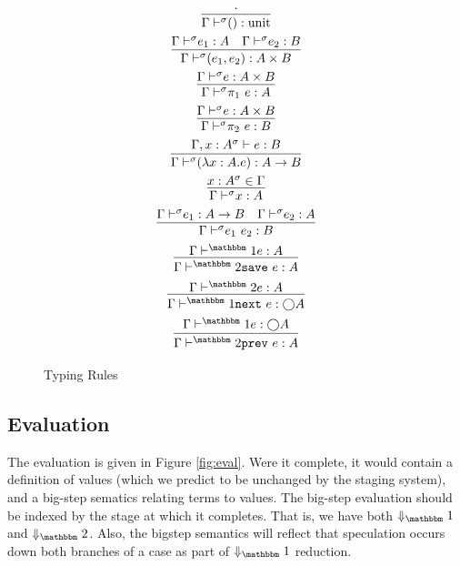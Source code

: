 \documentclass[11pt]{article}
\newcommand {\fut} {\bigcirc}
\newcommand {\bbone} {\mathbbm 1}
\newcommand {\bbtwo} {\mathbbm 2}
\newcommand {\pause} {{\tt save}}
\newcommand {\next} {{\tt next}}
\newcommand {\prev} {{\tt prev}}
\newcommand {\gds} {{\Gamma \vdash^\sigma}}
\newcommand {\letin} [3] {{\tt let}~{#1} = {#2}~{\tt in}~{#3}}
\newcommand {\caseof} [3] {{\tt case}~{#1} ~{\tt of}~{#2}~{\tt |}~{#3}}
\newcommand {\inferenceSpacing}{\setlength{\jot}{1.8ex}}
\begin{document}
\begin{figure}
\caption{Typing Rules}
\label{fig:staging}
\inferenceSpacing
\begin{gather}
\infer {\gds () : \text{unit}}{\cdot} \\
\infer {\gds (e_1,e_2) : A\times B}{\gds e_1 : A & \gds e_2 : B} \\
\infer {\gds \pi_1~e : A}{\gds e : A\times B} \\
\infer {\gds \pi_2~e : B}{\gds e : A\times B} \\
\infer {\gds (\lambda x:A.e) : A \to B}{\Gamma,x:A^\sigma \vdash e : B} \\
\infer {\gds x : A}{x : A^\sigma \in \Gamma} \\
\infer {\gds e_1~e_2 : B}{\gds e_1 : A \to B & \gds e_2 : A} \\
\infer {\Gamma \vdash^\bbtwo \pause~e : A}{\Gamma \vdash^\bbone e : A} \\
\infer {\Gamma \vdash^\bbone \next~e : \fut A}{\Gamma \vdash^\bbtwo e : A} \\
\infer {\Gamma \vdash^\bbtwo \prev~e : A}{\Gamma \vdash^\bbone e : \fut A} 
\end{gather}
\end{figure}

\subsection{Evaluation}
The evaluation is given in Figure \ref{fig:eval}.  Were it complete, it would contain a definition of values (which we predict to be unchanged by the staging system), and a big-step sematics relating terms to values.  The big-step evaluation should be indexed by the stage at which it completes.  That is, we have both $\Downarrow_\bbone$ and $\Downarrow_\bbtwo$.  Also, the bigstep semantics will reflect that speculation occurs down both branches of a case as part of  $\Downarrow_\bbone$ reduction.
\end{document}
